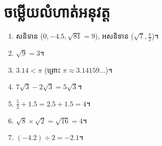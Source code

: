 \section{ចម្លើយលំហាត់អនុវត្ត}
\begin{enumerate}[label=\arabic*.]
    \item សនិទាន ($0, -4.5, \sqrt{81}=9$), អសនិទាន ($\sqrt{7}, \frac{\pi}{2}$)។
    \item $\sqrt{9} = 3$។
    \item $3.14 < \pi$ (ព្រោះ $\pi \approx 3.14159...$)។
    \item $7\sqrt{3} - 2\sqrt{3} = 5\sqrt{3}$។
    \item $\frac{5}{2} + 1.5 = 2.5 + 1.5 = 4$។
    \item $\sqrt{8} \times \sqrt{2} = \sqrt{16} = 4$។
    \item $(-4.2) \div 2 = -2.1$។
\end{enumerate}
